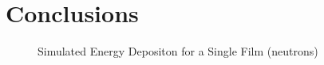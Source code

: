\section{Conclusions}
\label{sec:Conclusions}

\begin{figure}[h]
	\caption{Simulated Energy Depositon for a Single Film (neutrons)}
    \label{fig:SimEDepNeutron}
\end{figure}
